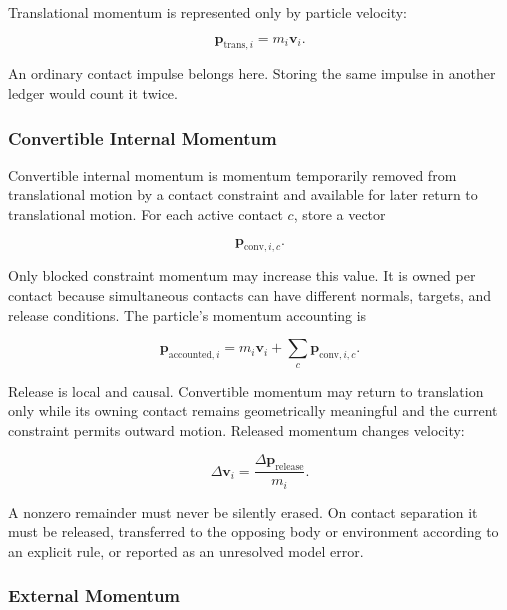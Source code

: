 Translational momentum is represented only by particle velocity:

\begin{equation}
\mathbf p_{\mathrm{trans},i}=m_i\mathbf v_i.
\end{equation}

An ordinary contact impulse belongs here.  Storing the same impulse in another
ledger would count it twice.

\subsubsection{Convertible Internal Momentum}

Convertible internal momentum is momentum temporarily removed from
translational motion by a contact constraint and available for later return to
translational motion.  For each active contact \(c\), store a vector

\begin{equation}
\mathbf p_{\mathrm{conv},i,c}.
\end{equation}

Only blocked constraint momentum may increase this value.  It is owned per
contact because simultaneous contacts can have different normals, targets,
and release conditions.  The particle's momentum accounting is

\begin{equation}
\mathbf p_{\mathrm{accounted},i}
=m_i\mathbf v_i+
\sum_c\mathbf p_{\mathrm{conv},i,c}.
\end{equation}

Release is local and causal.  Convertible momentum may return to translation
only while its owning contact remains geometrically meaningful and the current
constraint permits outward motion.  Released momentum changes velocity:

\begin{equation}
\Delta\mathbf v_i=
\frac{\Delta\mathbf p_{\mathrm{release}}}{m_i}.
\end{equation}

A nonzero remainder must never be silently erased.  On contact separation it
must be released, transferred to the opposing body or environment according to
an explicit rule, or reported as an unresolved model error.

\subsubsection{External Momentum}

